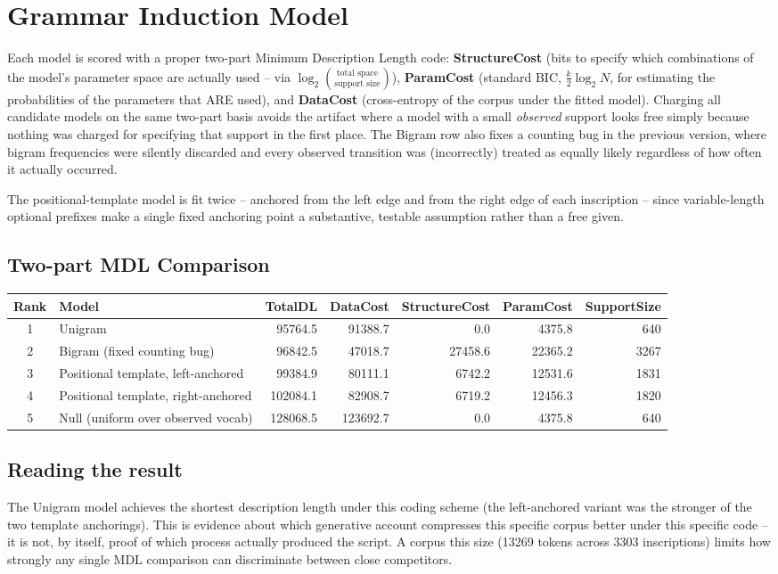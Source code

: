 \section{Grammar Induction Model}

Each model is scored with a proper two-part Minimum Description Length code:
\textbf{StructureCost} (bits to specify which combinations of the model's
parameter space are actually used -- via $\log_2 \binom{\text{total space}}{\text{support size}}$),
\textbf{ParamCost} (standard BIC, $\frac{k}{2}\log_2 N$, for estimating the
probabilities of the parameters that ARE used), and \textbf{DataCost}
(cross-entropy of the corpus under the fitted model). Charging all
candidate models on the same two-part basis avoids the artifact where a
model with a small \emph{observed} support looks free simply because nothing
was charged for specifying that support in the first place. The Bigram
row also fixes a counting bug in the previous version, where bigram
frequencies were silently discarded and every observed transition was
(incorrectly) treated as equally likely regardless of how often it actually
occurred.

The positional-template model is fit twice -- anchored from the left edge
and from the right edge of each inscription -- since variable-length
optional prefixes make a single fixed anchoring point a substantive,
testable assumption rather than a free given.

\subsection{Two-part MDL Comparison}
\begin{tabular}{cp{}rrrrr}
\toprule
\textbf{Rank} & \textbf{Model} & \textbf{TotalDL} & \textbf{DataCost} & \textbf{StructureCost} & \textbf{ParamCost} & \textbf{SupportSize} \\
\midrule
1 & Unigram & 95764.5 & 91388.7 & 0.0 & 4375.8 & 640 \\
2 & Bigram (fixed counting bug) & 96842.5 & 47018.7 & 27458.6 & 22365.2 & 3267 \\
3 & Positional template, left-anchored & 99384.9 & 80111.1 & 6742.2 & 12531.6 & 1831 \\
4 & Positional template, right-anchored & 102084.1 & 82908.7 & 6719.2 & 12456.3 & 1820 \\
5 & Null (uniform over observed vocab) & 128068.5 & 123692.7 & 0.0 & 4375.8 & 640 \\
\bottomrule
\end{tabular}

\subsection*{Reading the result}
The Unigram model achieves the shortest description length under this
coding scheme (the left-anchored variant was the stronger of the two template
anchorings). This is evidence about which generative account compresses
this specific corpus better under this specific code -- it is not, by
itself, proof of which process actually produced the script. A corpus this
size (13269 tokens across 3303 inscriptions) limits how strongly any
single MDL comparison can discriminate between close competitors.
